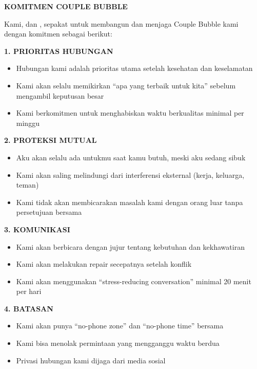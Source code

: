 \begin{exercisebox}
\textbf{KOMITMEN COUPLE BUBBLE}

Kami, \underline{\hspace{4cm}} dan \underline{\hspace{4cm}}, 
sepakat untuk membangun dan menjaga Couple Bubble kami dengan komitmen sebagai berikut:

\textbf{1. PRIORITAS HUBUNGAN}
\begin{itemize}
    \item[$\square$] Hubungan kami adalah prioritas utama setelah kesehatan dan keselamatan
    \item[$\square$] Kami akan selalu memikirkan ``apa yang terbaik untuk kita'' sebelum mengambil keputusan besar
    \item[$\square$] Kami berkomitmen untuk menghabiskan waktu berkualitas minimal \underline{\hspace{2cm}} per minggu
\end{itemize}

\textbf{2. PROTEKSI MUTUAL}
\begin{itemize}
    \item[$\square$] Aku akan selalu ada untukmu saat kamu butuh, meski aku sedang sibuk
    \item[$\square$] Kami akan saling melindungi dari interferensi eksternal (kerja, keluarga, teman)
    \item[$\square$] Kami tidak akan membicarakan masalah kami dengan orang luar tanpa persetujuan bersama
\end{itemize}

\textbf{3. KOMUNIKASI}
\begin{itemize}
    \item[$\square$] Kami akan berbicara dengan jujur tentang kebutuhan dan kekhawatiran
    \item[$\square$] Kami akan melakukan repair secepatnya setelah konflik
    \item[$\square$] Kami akan menggunakan ``stress-reducing conversation'' minimal 20 menit per hari
\end{itemize}

\textbf{4. BATASAN}
\begin{itemize}
    \item[$\square$] Kami akan punya ``no-phone zone'' dan ``no-phone time'' bersama
    \item[$\square$] Kami bisa menolak permintaan yang mengganggu waktu berdua
    \item[$\square$] Privasi hubungan kami dijaga dari media sosial
\end{itemize}


\end{exercisebox}

